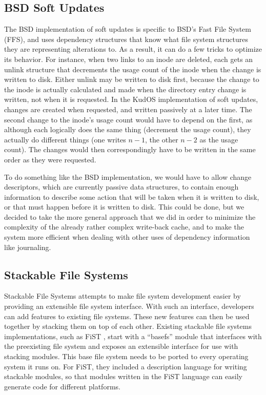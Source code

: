 \subsection{BSD Soft Updates}
\label{sec:related:soft}

The BSD implementation of soft updates \cite{ganger00soft} is specific to BSD's
Fast File System (FFS), and uses dependency structures that know what file
system structures they are representing alterations to. As a result, it can do a
few tricks to optimize its behavior. For instance, when two links to an inode
are deleted, each gets an unlink structure that decrements the usage count of
the inode when the change is written to disk. Either unlink may be written to
disk first, because the change to the inode is actually calculated and made when
the directory entry change is written, not when it is requested. In the KudOS
implementation of soft updates, changes are created when requested, and written
passively at a later time. The second change to the inode's usage count would
have to depend on the first, as although each logically does the same thing
(decrement the usage count), they actually do different things (one writes $n -
1$, the other $n - 2$ as the usage count). The changes would then
correspondingly have to be written in the same order as they were requested.

To do something like the BSD implementation, we would have to allow change
descriptors, which are currently passive data structures, to contain enough
information to describe some action that will be taken when it is written to
disk, or that must happen before it is written to disk. This could be done, but
we decided to take the more general approach that we did in order to minimize
the complexity of the already rather complex write-back cache, and to make the
system more efficient when dealing with other uses of dependency information
like journaling.

\subsection{Stackable File Systems}
\label{sec:related:sfs}

Stackable File Systems \cite{heidemann93stack} attempts to make file system
development easier by providing an extensible file system interface. With such
an interface, developers can add features to existing file systems. These new
features can then be used together by stacking them on top of each other.
Existing stackable file systems implementations, such as FiST
\cite{zadok00fist}, start with a ``basefs'' module that interfaces with the
preexisting file system and exposes an extensible interface for use with
stacking modules. This base file system needs to be ported to every operating
system it runs on. For FiST, they included a description language for writing
stackable modules, so that modules written in the FiST language can easily
generate code for different platforms.

